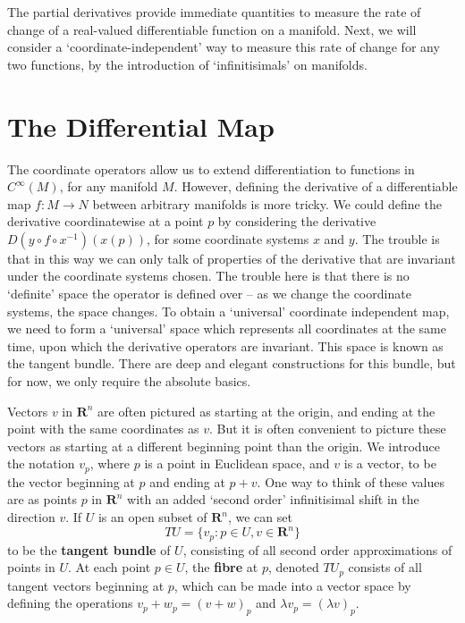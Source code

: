 The partial derivatives provide immediate quantities to measure the rate of change of a real-valued differentiable function on a manifold. Next, we will consider a `coordinate-independent' way to measure this rate of change for any two functions, by the introduction of `infinitisimals' on manifolds.

\section{The Differential Map}

The coordinate operators allow us to extend differentiation to functions in $C^\infty(M)$, for any manifold $M$. However, defining the derivative of a differentiable map $f: M \to N$ between arbitrary manifolds is more tricky. We could define the derivative coordinatewise at a point $p$ by considering the derivative $D(y \circ f \circ x^{-1})(x(p))$, for some coordinate systems $x$ and $y$. The trouble is that in this way we can only talk of properties of the derivative that are invariant under the coordinate systems chosen. The trouble here is that there is no `definite' space the operator is defined over -- as we change the coordinate systems, the space changes. To obtain a `universal' coordinate independent map, we need to form a `universal' space which represents all coordinates at the same time, upon which the derivative operators are invariant. This space is known as the tangent bundle. There are deep and elegant constructions for this bundle, but for now, we only require the absolute basics.

Vectors $v$ in $\mathbf{R}^n$ are often pictured as starting at the origin, and ending at the point with the same coordinates as $v$. But it is often convenient to picture these vectors as starting at a different beginning point than the origin. We introduce the notation $v_p$, where $p$ is a point in Euclidean space, and $v$ is a vector, to be the vector beginning at $p$ and ending at $p + v$. One way to think of these values are as points $p$ in $\mathbf{R}^n$ with an added `second order' infinitisimal shift in the direction $v$. If $U$ is an open subset of $\mathbf{R}^n$, we can set
%
\[ TU = \{ v_p : p \in U, v \in \mathbf{R}^n \} \]
%
to be the {\bf tangent bundle} of $U$, consisting of all second order approximations of points in $U$. At each point $p \in U$, the {\bf fibre} at $p$, denoted $TU_p$ consists of all tangent vectors beginning at $p$, which can be made into a vector space by defining the operations $v_p + w_p = (v + w)_p$ and $\lambda v_p = (\lambda v)_p$.

